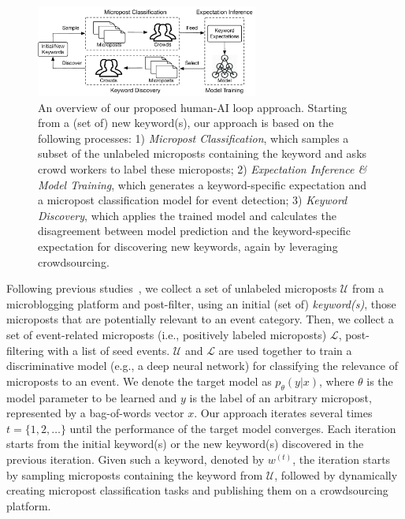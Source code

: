 \documentclass[letterpaper]{article}
\begin{document}
\begin{figure}[t!]
\centering
\includegraphics[width=0.65\textwidth]{img/framework}
\caption{An overview of our proposed human-AI loop approach. Starting from a (set of) new keyword(s), our approach is based on the following processes: 1) \emph{Micropost Classification}, which samples a subset of the unlabeled microposts containing the keyword and asks crowd workers to label these microposts; 2) \emph{Expectation Inference \& Model Training}, which generates a keyword-specific expectation and a micropost classification model for event detection; 3) \emph{Keyword Discovery}, which applies the trained model and calculates the disagreement between model prediction and the keyword-specific expectation for discovering new keywords, again by leveraging crowdsourcing.} 
\label{fig:system}
\end{figure}

Following previous studies~\cite{ritter2015weakly,chang2016expectation,chambers2018detecting}, we collect a set of unlabeled microposts $\mathcal{U}$ from a microblogging platform and post-filter,  using an initial (set of) \emph{keyword(s)}, those microposts that are potentially relevant to an event category. Then, we collect a set of event-related microposts (i.e., positively labeled microposts) $\mathcal{L}$, post-filtering with a list of seed events. $\mathcal{U}$ and $\mathcal{L}$ are used together to train a discriminative model (e.g., a deep neural network) for classifying the relevance of microposts to an event. We denote the target model as $p_\theta(y|x)$, where $\theta$ is the model parameter to be learned and $y$ is the label of an arbitrary micropost, represented by a bag-of-words vector $x$. Our approach iterates several times $t=\{1, 2, \ldots\}$ until the performance of the target model converges. Each iteration starts from the initial keyword(s) or the new keyword(s) discovered in the previous iteration. Given such a keyword, denoted by $w^{(t)}$, the iteration starts by sampling microposts containing the keyword from $\mathcal{U}$, followed by dynamically creating micropost classification tasks and publishing them on a crowdsourcing platform.
\end{document}
